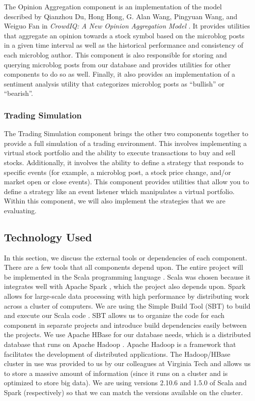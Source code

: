 The Opinion Aggregation component is an implementation of the model described by Qianzhou Du, Hong Hong, G. Alan Wang, Pingyuan Wang, and Weiguo Fan in \textit{CrowdIQ: A New Opinion Aggregation Model} \cite{crowdiq}.
It provides utilities that aggregate an opinion towards a stock symbol based on the microblog posts in a given time interval as well as the historical performance and consistency of each microblog author.
This component is also responsible for storing and querying microblog posts from our database and provides utilities for other components to do so as well.
Finally, it also provides an implementation of a sentiment analysis utility that categorizes microblog posts as ``bullish'' or ``bearish''.

\subsubsection{Trading Simulation}

The Trading Simulation component brings the other two components together to provide a full simulation of a trading environment.
This involves implementing a virtual stock portfolio and the ability to execute transactions to buy and sell stocks.
Additionally, it involves the ability to define a strategy that responds to specific events (for example, a microblog post, a stock price change, and/or market open or close events).
This component provides utilities that allow you to define a strategy like an event listener which manipulates a virtual portfolio.
Within this component, we will also implement the strategies that we are evaluating.

\subsection{Technology Used}

In this section, we discuss the external tools or dependencies of each component.
There are a few tools that all components depend upon.
The entire project will be implemented in the Scala programming language \cite{scala}.
Scala was chosen because it integrates well with Apache Spark \cite{spark}, which the project also depends upon.
Spark allows for large-scale data processing with high performance by distributing work across a cluster of computers.
We are using the Simple Build Tool (SBT) to build and execute our Scala code \cite{sbt}.
SBT allows us to organize the code for each component in separate projects and introduce build dependencies easily between the projects.
We use Apache HBase \cite{hbase} for our database needs, which is a distributed database that runs on Apache Hadoop \cite{hadoop}.
Apache Hadoop is a framework that facilitates the development of distributed applications.
The Hadoop/HBase cluster in use was provided to us by our colleagues at Virginia Tech and allows us to store a massive amount of information (since it runs on a cluster and is optimized to store big data).
We are using versions 2.10.6 and 1.5.0 of Scala and Spark (respectively) so that we can match the versions available on the cluster.

